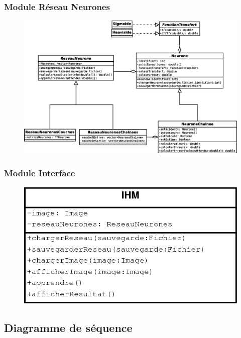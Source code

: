 	\subsubsection{Module R\'eseau Neurones}
	
\begin{figure}[H]
	\centering
	\includegraphics[width=1\linewidth]{diag/class_neurone.png}
\end{figure}

	\subsubsection{Module Interface}
	
\begin{figure}[H]
	\centering
	\includegraphics[width=0.4\linewidth]{diag/class_vue.png}
\end{figure}

	\subsection{Diagramme de séquence}

